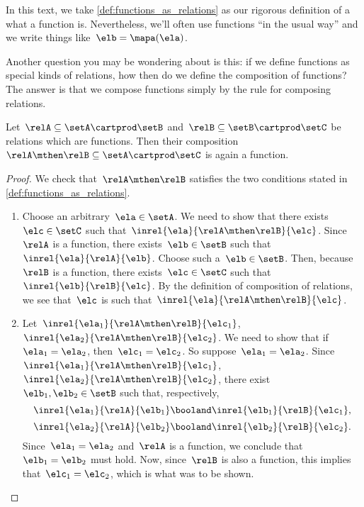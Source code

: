 In this text, we take \cref{def:functions_as_relations} as our rigorous definition of a what a function is.
Nevertheless, we'll often use functions ``in the usual way'' and we write things like~$\elb = \mapa(\ela)$.

Another question you may be wondering about is this: if we define functions as special kinds of relations, how then do we define the composition of functions?
The answer is that we compose functions simply by the rule for composing relations.

\begin{lemma}
	\label{lem:comprelfun}
	Let~$\relA \subseteq \setA \cartprod \setB$ and~$\relB \subseteq \setB \cartprod \setC$ be relations which are functions.
	Then their composition~$\relA \mthen \relB \subseteq \setA \cartprod \setC$ is again a function.
\end{lemma}

\begin{proof}
	We check that~$\relA \mthen \relB$ satisfies the two conditions stated in \cref{def:functions_as_relations}.

	\begin{enumerate}
		\item Choose an arbitrary~$\ela \in \setA$.
		      We need to show that there exists~$\elc \in \setC$ such that~$\inrel{\ela}{\relA \mthen \relB}{\elc}$.
		      Since~$\relA$ is a function, there exists~$\elb \in \setB$ such that~$\inrel{\ela}{\relA}{\elb}$.
		      Choose such a~$\elb \in \setB$.
		      Then, because~$\relB$ is a function, there exists~$\elc \in \setC$ such that~$\inrel{\elb}{\relB}{\elc}$.
		      By the definition of composition of relations, we see that~$\elc$ is such that~$\inrel{\ela}{\relA \mthen \relB}{\elc}$.
		\item Let~$\inrel{\ela_1}{\relA \mthen \relB}{\elc_1}$,~$\inrel{\ela_2}{\relA \mthen \relB}{\elc_2}$.
		      We need to show that if~$\ela_1 = \ela_2$, then~$\elc_1 = \elc_2$.
		      So suppose~$\ela_1 = \ela_2$.
		      Since~$\inrel{\ela_1}{\relA \mthen \relB}{\elc_1}$,~$\inrel{\ela_2}{\relA \mthen \relB}{\elc_2}$, there exist~$\elb_1, \elb_2 \in \setB$ such that, respectively,
		      \begin{equation*}
			      \inrel{\ela_1}{\relA}{\elb_1} \booland \inrel{\elb_1}{\relB}{\elc_1},
		      \end{equation*}
		      \begin{equation*}
			      \inrel{\ela_2}{\relA}{\elb_2} \booland \inrel{\elb_2}{\relB}{\elc_2}.
		      \end{equation*}
		      Since~$\ela_1 = \ela_2$ and~$\relA$ is a function, we conclude that~$\elb_1 = \elb_2$ must hold.
		      Now, since~$\relB$ is also a function, this implies that~$\elc_1 = \elc_2$, which is what was to be shown.
	\end{enumerate}
\end{proof}

